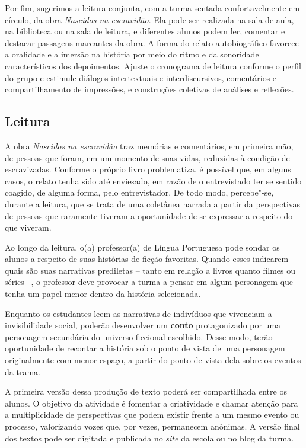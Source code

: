 \documentclass[12pt]{extarticle}
\begin{document}
Por fim, sugerimos a leitura conjunta, com a turma sentada
confortavelmente em círculo, da obra \emph{Nascidos na escravidão}. Ela
pode ser realizada na sala de aula, na biblioteca ou na sala de leitura,
e diferentes alunos podem ler, comentar e destacar passagens marcantes
da obra. A forma do relato autobiográfico favorece a oralidade e a
imersão na história por meio do ritmo e da sonoridade característicos
dos depoimentos. Ajuste o cronograma de leitura conforme o perfil do
grupo e estimule diálogos intertextuais e interdiscursivos, comentários
e compartilhamento de impressões, e construções coletivas de análises e
reflexões.

\subsection{Leitura}


A obra \emph{Nascidos na escravidão} traz memórias e
comentários, em primeira mão, de pessoas que foram, em um momento de
suas vidas, reduzidas à condição de escravizadas. Conforme o próprio
livro problematiza, é possível que, em alguns casos, o relato tenha sido
até enviesado, em razão de o entrevistado ter se sentido coagido, de
alguma forma, pelo entrevistador. De todo modo, percebe"-se, durante a
leitura, que se trata de uma coletânea narrada a partir da perspectivas
de pessoas que raramente tiveram a oportunidade de se expressar a
respeito do que viveram.

Ao longo da leitura, o(a) professor(a) de Língua Portuguesa pode sondar
os alunos a respeito de suas histórias de ficção favoritas. Quando esses
indicarem quais são suas narrativas prediletas -- tanto em relação a
livros quanto filmes ou séries --, o professor deve provocar a turma a
pensar em algum personagem que tenha um papel menor dentro da história
selecionada.

Enquanto os estudantes leem as narrativas de indivíduos que vivenciam a
invisibilidade social, poderão desenvolver um \textbf{conto}
protagonizado por uma personagem secundária do universo ficcional
escolhido. Desse modo, terão oportunidade de recontar a história sob o
ponto de vista de uma personagem originalmente com menor espaço, a
partir do ponto de vista dela sobre os eventos da trama.

A primeira versão dessa produção de texto poderá ser compartilhada entre
os alunos. O objetivo da atividade é fomentar a criatividade e chamar
atenção para a multiplicidade de perspectivas que podem existir frente a
um mesmo evento ou processo, valorizando vozes que, por vezes,
permanecem anônimas. A versão final dos textos pode ser digitada e
publicada no \emph{site} da escola ou no blog da turma.
\end{document}
